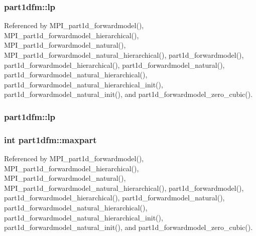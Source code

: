 \subsubsection[{\texorpdfstring{lp}{lp}}]{ part1dfm\+::lp}\hypertarget{structpart1dfm_a6ce4c88ae82b1dd307742d27ec27855e}{}\label{structpart1dfm_a6ce4c88ae82b1dd307742d27ec27855e}


Referenced by M\+P\+I\+\_\+part1d\+\_\+forwardmodel(), M\+P\+I\+\_\+part1d\+\_\+forwardmodel\+\_\+hierarchical(), M\+P\+I\+\_\+part1d\+\_\+forwardmodel\+\_\+natural(), M\+P\+I\+\_\+part1d\+\_\+forwardmodel\+\_\+natural\+\_\+hierarchical(), part1d\+\_\+forwardmodel(), part1d\+\_\+forwardmodel\+\_\+hierarchical(), part1d\+\_\+forwardmodel\+\_\+natural(), part1d\+\_\+forwardmodel\+\_\+natural\+\_\+hierarchical(), part1d\+\_\+forwardmodel\+\_\+natural\+\_\+hierarchical\+\_\+init(), part1d\+\_\+forwardmodel\+\_\+natural\+\_\+init(), and part1d\+\_\+forwardmodel\+\_\+zero\+\_\+cubic().

\subsubsection[{\texorpdfstring{lp}{lp}}]{ part1dfm\+::lp}\hypertarget{structpart1dfm_a87c96fbd07d516e02796d77d36209c57}{}\label{structpart1dfm_a87c96fbd07d516e02796d77d36209c57}
\subsubsection[{\texorpdfstring{maxpart}{maxpart}}]{\setlength{\rightskip}{0pt plus 5cm}int part1dfm\+::maxpart}\hypertarget{structpart1dfm_ae2c83da1f9e4050b85dc759aa93473e8}{}\label{structpart1dfm_ae2c83da1f9e4050b85dc759aa93473e8}


Referenced by M\+P\+I\+\_\+part1d\+\_\+forwardmodel(), M\+P\+I\+\_\+part1d\+\_\+forwardmodel\+\_\+hierarchical(), M\+P\+I\+\_\+part1d\+\_\+forwardmodel\+\_\+natural(), M\+P\+I\+\_\+part1d\+\_\+forwardmodel\+\_\+natural\+\_\+hierarchical(), part1d\+\_\+forwardmodel(), part1d\+\_\+forwardmodel\+\_\+hierarchical(), part1d\+\_\+forwardmodel\+\_\+natural(), part1d\+\_\+forwardmodel\+\_\+natural\+\_\+hierarchical(), part1d\+\_\+forwardmodel\+\_\+natural\+\_\+hierarchical\+\_\+init(), part1d\+\_\+forwardmodel\+\_\+natural\+\_\+init(), and part1d\+\_\+forwardmodel\+\_\+zero\+\_\+cubic().

